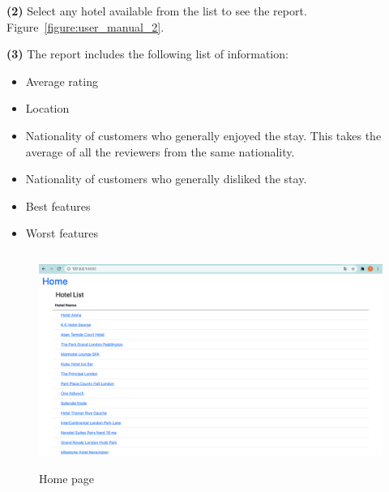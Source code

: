 \documentclass[a4paper]{report}
\begin{document}
\noindent
\textbf{(2)} Select any hotel available from the list to see the report. Figure~\ref{figure:user_manual_2}.

\noindent
\textbf{(3)} The report includes the following list of information:
\begin{itemize}
	\item Average rating
	\item Location
	\item Nationality of customers who generally enjoyed the stay. This takes the average of all the reviewers from the same nationality.
	\item Nationality of customers who generally disliked the stay.
	\item Best features
	\item Worst features
\end{itemize}

\begin{figure}[h]
\includegraphics[width=\textwidth, height=7cm, keepaspectratio]{user_manual_1.png}
\centering
\caption{Home page}
\label{figure:user_manual_1}
\end{figure}
\end{document}
